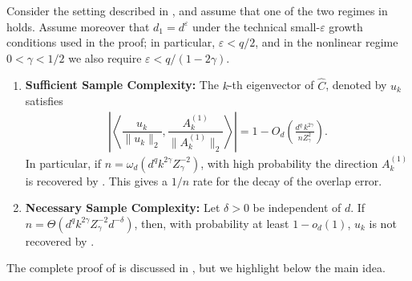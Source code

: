 \documentclass[]{article}
\numberwithin{equation}{section}
\theoremstyle{definition}
\begin{document}
\begin{theorem}
    Consider the setting described in , and assume that one of the two regimes in  holds. Assume moreover that $d_1=d^\varepsilon$ under the technical small-$\varepsilon$ growth conditions used in the proof; in particular, $\varepsilon<q/2$, and in the nonlinear regime $0<\gamma<1/2$ we also require $\varepsilon<q/(1-2\gamma)$. 
    \begin{enumerate}
        \setlength{\itemsep}{0pt}
        \setlength{\parsep}{0pt}
        \setlength{\topsep}{0pt}
        \setlength{\partopsep}{0pt}
        \item \textbf{Sufficient Sample Complexity:} The $k$-th eigenvector of $\hat{C}$, denoted by $u_{k}$ satisfies 
    \begin{align}\label{eq:ov_rate}
    \left | \left \langle \dfrac{u_{k}}{\|u_{k}\|_2}, \dfrac{A^{(1)}_{k}}{\|A^{(1)}_{k} \|_2 } \right \rangle  \right | = 1 - O_d\left(
    \frac{d^q\,k^{2\gamma}}{nZ_\gamma^2}
\right). 
    \end{align}
    In particular, if $n = \omega_{d} \left (d^{q} k^{2\gamma}Z_{\gamma}^{-2} \right)$, with high probability the direction $A^{(1)}_{k}$ is recovered by  . This gives a $1/n$ rate for the decay of the overlap error. 
    \item \textbf{Necessary Sample Complexity:} Let $\delta>0$ be independent of $d$.  If $n = \Theta \left (d^{q} k^{2\gamma}Z_\gamma^{-2} d^{-\delta}\right)$, then, with probability at least $1 - o_{d}(1)$,  $u_{k}$ is not recovered by . 
    \end{enumerate}
    \label{thm:sample_complexity}
\end{theorem}
The complete proof of  is discussed in , but we highlight below the main idea.
\end{document}
